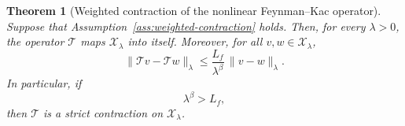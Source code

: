 \documentclass[10pt,a4paper]{amsart}
\newtheorem{theorem}{Theorem}
\begin{document}
\begin{theorem}[Weighted contraction of the nonlinear Feynman--Kac operator]
\label{thm:weighted-contraction-final}
Suppose that Assumption~\ref{ass:weighted-contraction} holds. Then, for every $\lambda>0$, the operator $\mathcal{T}$ maps $\mathcal{X}_\lambda$ into itself. Moreover, for all $v,w\in\mathcal{X}_\lambda$,
\begin{equation}\label{eq:weighted-contraction-est-final}
\|\mathcal{T}v-\mathcal{T}w\|_\lambda
\le
\frac{L_f}{\lambda^\beta}\,\|v-w\|_\lambda .
\end{equation}
In particular, if
\begin{equation}\label{eq:lambda-condition-final}
\lambda^\beta>L_f,
\end{equation}
then $\mathcal{T}$ is a strict contraction on $\mathcal{X}_\lambda$.
\end{theorem}
\end{document}
